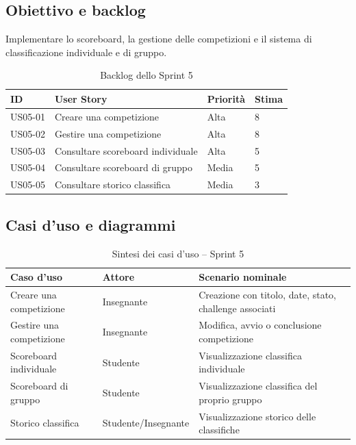 \subsection{Obiettivo e backlog}
\label{subsec:sprint5-obiettivo}

Implementare lo scoreboard, la gestione delle competizioni e il sistema di classificazione individuale e di gruppo.

\begin{table}[H]
    \centering
    \caption{Backlog dello Sprint 5}
    \label{tab:sprint5-backlog}
    \renewcommand{\arraystretch}{1.3}
    \begin{tabular}{|p{1.8cm}|p{7cm}|p{2.5cm}|p{1.5cm}|}
        \hline
        \textbf{ID} & \textbf{User Story} & \textbf{Priorità} & \textbf{Stima} \\
        \hline
        US05-01 & Creare una competizione & Alta & 8 \\
        \hline
        US05-02 & Gestire una competizione & Alta & 8 \\
        \hline
        US05-03 & Consultare scoreboard individuale & Alta & 5 \\
        \hline
        US05-04 & Consultare scoreboard di gruppo & Media & 5 \\
        \hline
        US05-05 & Consultare storico classifica & Media & 3 \\
        \hline
    \end{tabular}
\end{table}

\subsection{Casi d'uso e diagrammi}
\label{subsec:sprint5-casi-uso}

\begin{table}[H]
    \centering
    \caption{Sintesi dei casi d'uso -- Sprint 5}
    \label{tab:uc-sprint5}
    \renewcommand{\arraystretch}{1.3}
    \begin{tabular}{|p{3cm}|p{2.5cm}|p{8.5cm}|}
        \hline
        \textbf{Caso d'uso} & \textbf{Attore} & \textbf{Scenario nominale} \\
        \hline
        Creare una competizione & Insegnante & Creazione con titolo, date, stato, challenge associati \\
        \hline
        Gestire una competizione & Insegnante & Modifica, avvio o conclusione competizione \\
        \hline
        Scoreboard individuale & Studente & Visualizzazione classifica individuale \\
        \hline
        Scoreboard di gruppo & Studente & Visualizzazione classifica del proprio gruppo \\
        \hline
        Storico classifica & Studente/Insegnante & Visualizzazione storico delle classifiche \\
        \hline
    \end{tabular}
\end{table}

